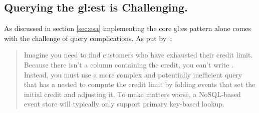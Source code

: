 
\subsection{Querying the \gls{gl:est} is Challenging.}

As discussed in section \ref{sec:esa} implementing the core \gls{gl:es} pattern alone comes with the challenge of query complications. As put by~\citep{richardson2018microservices}:

\begin{quote}
  Imagine you need to find customers who have exhausted their credit limit. Because there isn’t a column containing the credit, you can’t write . Instead, you must use a more complex and potentially inefficient query that has a nested  to compute the credit limit by folding events that set the initial credit and adjusting it. To make matters worse, a NoSQL-based event store will typically only support primary key-based lookup.
\end{quote}

